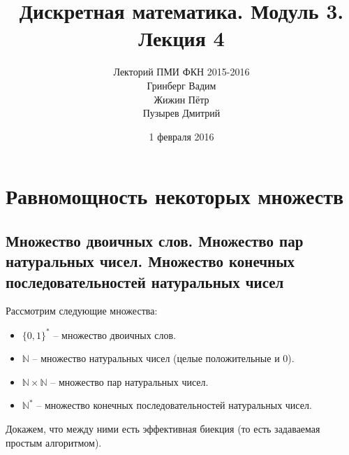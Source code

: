\documentclass[a4paper, 12pt]{article}
\newcommand{\N}{\mathbb{N}}
\begin{document}
\title{Дискретная математика. Модуль 3. Лекция 4}
\author{Лекторий ПМИ ФКН 2015-2016\\Гринберг Вадим\\Жижин Пётр\\Пузырев Дмитрий}
\date{1 февраля 2016}

\maketitle
\section{Равномощность некоторых множеств}
\subsection*{Множество двоичных слов. Множество пар натуральных чисел. Множество конечных последовательностей натуральных чисел}

Рассмотрим следующие множества:

\begin{itemize}
        \item $\{ 0, 1\}^*$ -- множество двоичных слов.
        \item $\N$ -- множество натуральных чисел (целые положительные и 0).
        \item $\N \times \N$ -- множество пар натуральных чисел.
        \item $\N^*$ -- множество конечных последовательностей натуральных чисел.
\end{itemize}

Докажем, что между ними есть эффективная биекция (то есть задаваемая простым алгоритмом).
\end{document}
